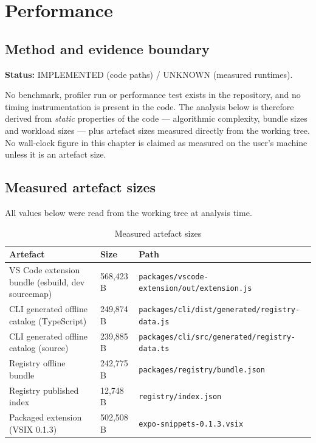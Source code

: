 \chapter{Performance}
\label{ch:performance}

\section{Method and evidence boundary}

\textbf{Status:} IMPLEMENTED (code paths) / UNKNOWN (measured runtimes).

No benchmark, profiler run or performance test exists in the repository, and no
timing instrumentation is present in the code. The analysis below is therefore
derived from \emph{static} properties of the code --- algorithmic complexity,
bundle sizes and workload sizes --- plus artefact sizes measured directly from
the working tree. No wall-clock figure in this chapter is claimed as measured on
the user's machine unless it is an artefact size.

\section{Measured artefact sizes}

All values below were read from the working tree at analysis time.

\begin{longtable}{p{7.4cm}p{2.6cm}p{3.8cm}}
\caption{Measured artefact sizes}\\
\toprule
\textbf{Artefact} & \textbf{Size} & \textbf{Path} \\
\midrule

VS Code extension bundle (esbuild, dev sourcemap) & 568{,}423 B & \texttt{packages/vscode-extension/out/extension.js} \\
CLI generated offline catalog (TypeScript) & 249{,}874 B & \texttt{packages/cli/dist/generated/registry-data.js} \\
CLI generated offline catalog (source) & 239{,}885 B & \texttt{packages/cli/src/generated/registry-data.ts} \\
Registry offline bundle & 242{,}775 B & \texttt{packages/registry/bundle.json} \\
Registry published index & 12{,}748 B & \texttt{registry/index.json} \\
Packaged extension (VSIX 0.1.3) & 502{,}508 B & \texttt{expo-snippets-0.1.3.vsix} \\
\bottomrule
\end{longtable}

